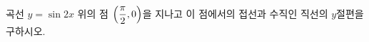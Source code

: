 곡선 $y=\sin 2x$ 위의 점 $\left(\dfrac{\pi}{2}{,}\mkern3mu\mathopen{}0\right)$을 지나고 이 점에서의 접선과 수직인 직선의 $y$절편을 구하시오.
